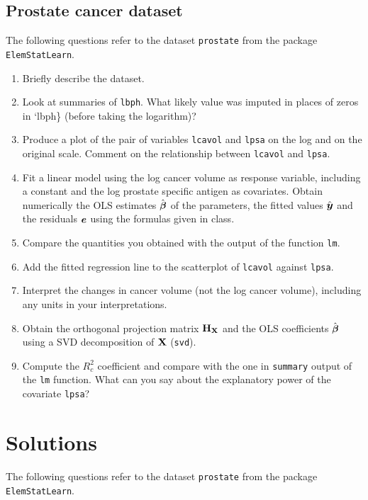 \documentclass[]{book}
\providecommand{\tightlist}{%
  \setlength{\itemsep}{0pt}\setlength{\parskip}{0pt}}
\theoremstyle{definition}
\theoremstyle{definition}
\theoremstyle{definition}
\theoremstyle{remark}
\begin{document}
\subsection{Prostate cancer dataset}\label{prostate-cancer-dataset}

The following questions refer to the dataset \texttt{prostate} from the
package \texttt{ElemStatLearn}.

\begin{enumerate}
\def\labelenumi{\alph{enumi}.}
\tightlist
\item
  Briefly describe the dataset.
\item
  Look at summaries of \texttt{lbph}. What likely value was imputed in
  places of zeros in `lbph\} (before taking the logarithm)?
\item
  Produce a plot of the pair of variables \texttt{lcavol} and
  \texttt{lpsa} on the log and on the original scale. Comment on the
  relationship between \texttt{lcavol} and \texttt{lpsa}.
\item
  Fit a linear model using the log cancer volume as response variable,
  including a constant and the log prostate specific antigen as
  covariates. Obtain numerically the OLS estimates \(\hat{\boldsymbol{\beta}}\) of the
  parameters, the fitted values \(\hat{\boldsymbol{y}}\) and the residuals
  \(\boldsymbol{e}\) using the formulas given in class.
\item
  Compare the quantities you obtained with the output of the function
  \texttt{lm}.
\item
  Add the fitted regression line to the scatterplot of \texttt{lcavol}
  against \texttt{lpsa}.
\item
  Interpret the changes in cancer volume (not the log cancer volume),
  including any units in your interpretations.
\item
  Obtain the orthogonal projection matrix \(\bf{H}_{\mathbf{X}}\) and the OLS
  coefficients \(\hat{\boldsymbol{\beta}}\) using a SVD decomposition of \(\mathbf{X}\)
  (\texttt{svd}).
\item
  Compute the \(R^2_c\) coefficient and compare with the one in
  \texttt{summary} output of the \texttt{lm} function. What can you say
  about the explanatory power of the covariate \texttt{lpsa}?
\end{enumerate}

\section{Solutions}\label{solutions}

The following questions refer to the dataset \texttt{prostate} from the
package \texttt{ElemStatLearn}.
\end{document}
